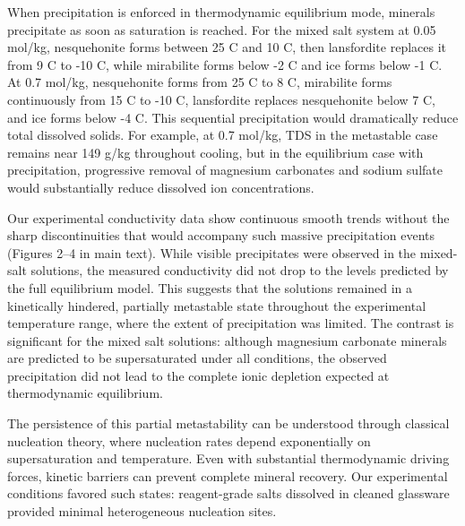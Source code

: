 \documentclass[journal=aesccq,manuscript=suppinfo]{achemso}
\begin{document}
When precipitation is enforced in thermodynamic equilibrium mode, minerals precipitate as soon as saturation is reached. For the mixed salt system at 0.05 mol/kg, nesquehonite forms between 25 \textdegree C and 10 \textdegree C, then lansfordite replaces it from 9 \textdegree C to -10 \textdegree C, while mirabilite forms below -2 \textdegree C and ice forms below -1 \textdegree C. At 0.7 mol/kg, nesquehonite forms from 25 \textdegree C to 8 \textdegree C, mirabilite forms continuously from 15 \textdegree C to -10 \textdegree C, lansfordite replaces nesquehonite below 7 \textdegree C, and ice forms below -4 \textdegree C. This sequential precipitation would dramatically reduce total dissolved solids. For example, at 0.7 mol/kg, TDS in the metastable case remains near 149 g/kg throughout cooling, but in the equilibrium case with precipitation, progressive removal of magnesium carbonates and sodium sulfate would substantially reduce dissolved ion concentrations.

Our experimental conductivity data show continuous smooth trends without the sharp discontinuities that would accompany such massive precipitation events (Figures 2--4 in main text). While visible precipitates were observed in the mixed-salt solutions, the measured conductivity did not drop to the levels predicted by the full equilibrium model. This suggests that the solutions remained in a kinetically hindered, partially metastable state throughout the experimental temperature range, where the extent of precipitation was limited. The contrast is significant for the mixed salt solutions: although magnesium carbonate minerals are predicted to be supersaturated under all conditions, the observed precipitation did not lead to the complete ionic depletion expected at thermodynamic equilibrium.

The persistence of this partial metastability can be understood through classical nucleation theory, where nucleation rates depend exponentially on supersaturation and temperature. Even with substantial thermodynamic driving forces, kinetic barriers can prevent complete mineral recovery. Our experimental conditions favored such states: reagent-grade salts dissolved in cleaned glassware provided minimal heterogeneous nucleation sites. %
\end{document}
